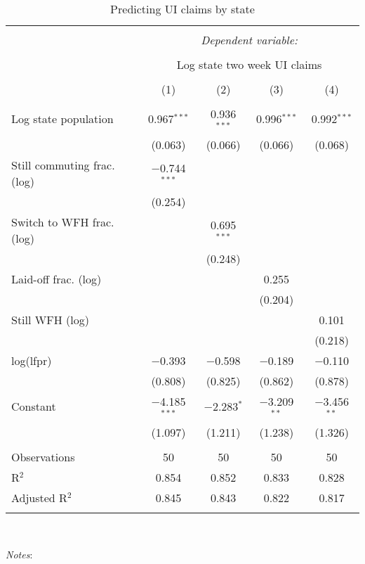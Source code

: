 
\begin{table}[!htbp] \centering 
  \caption{Predicting UI claims by state} 
  \label{tab:ui} 
\small 
\begin{tabular}{@{\extracolsep{5pt}}lcccc} 
\\[-1.8ex]\hline 
\hline \\[-1.8ex] 
 & \multicolumn{4}{c}{\textit{Dependent variable:}} \\ 
\cline{2-5} 
\\[-1.8ex] & \multicolumn{4}{c}{Log state two week UI claims} \\ 
\\[-1.8ex] & (1) & (2) & (3) & (4)\\ 
\hline \\[-1.8ex] 
 Log state population & 0.967$^{***}$ & 0.936$^{***}$ & 0.996$^{***}$ & 0.992$^{***}$ \\ 
  & (0.063) & (0.066) & (0.066) & (0.068) \\ 
  Still commuting frac. (log) & $-$0.744$^{***}$ &  &  &  \\ 
  & (0.254) &  &  &  \\ 
  Switch to WFH frac. (log) &  & 0.695$^{***}$ &  &  \\ 
  &  & (0.248) &  &  \\ 
  Laid-off frac. (log) &  &  & 0.255 &  \\ 
  &  &  & (0.204) &  \\ 
  Still WFH (log) &  &  &  & 0.101 \\ 
  &  &  &  & (0.218) \\ 
  log(lfpr) & $-$0.393 & $-$0.598 & $-$0.189 & $-$0.110 \\ 
  & (0.808) & (0.825) & (0.862) & (0.878) \\ 
  Constant & $-$4.185$^{***}$ & $-$2.283$^{*}$ & $-$3.209$^{**}$ & $-$3.456$^{**}$ \\ 
  & (1.097) & (1.211) & (1.238) & (1.326) \\ 
 \hline \\[-1.8ex] 
Observations & 50 & 50 & 50 & 50 \\ 
R$^{2}$ & 0.854 & 0.852 & 0.833 & 0.828 \\ 
Adjusted R$^{2}$ & 0.845 & 0.843 & 0.822 & 0.817 \\ 
\hline 
\hline \\[-1.8ex] 
\end{tabular}
\\
\begin{minipage}{1.0 \textwidth}
{\footnotesize \emph{Notes}: 
\starlanguage}
\end{minipage}
\end{table}
